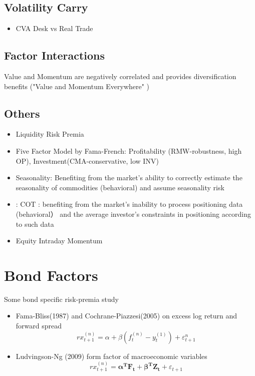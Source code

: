 \documentclass[11pt, openany]{book}              %
\begin{document}
\subsection{Volatility Carry}
\begin{itemize}
	\item  CVA Desk vs Real Trade
\end{itemize}

\subsection{Factor Interactions}
Value and Momentum are negatively correlated and provides diversification benefits ("Value and Momentum Everywhere" )

\subsection{Others}
\begin{itemize}
	\item Liquidity Risk Premia 
	\item Five Factor Model by Fama-French: Profitability (RMW-robustness, high OP), Investment(CMA-conservative, low INV)
	\item Seasonality: Benefiting from the market's ability to correctly estimate the seasonality of commodities (behavioral) and assume seasonality risk
	\item: COT : benefiting from the market's inability to process positioning data (behavioral） and the average investor's constraints in positioning according to such data
	\item Equity Intraday Momentum
\end{itemize}

\section{Bond Factors}

Some bond specific risk-premia study

\begin{itemize}
	\item Fama-Bliss(1987) and Cochrane-Piazzesi(2005) on excess log return and forward spread
		$$rx_{t+1}^{(n)} = \alpha + \beta (f_t^{(n)} - y_t^{(1)}) + \varepsilon_{t+1}^n$$
	\item Ludvingson-Ng (2009) form factor of macroeconomic variables
	$$rx_{t+1}^{(n)} = \boldsymbol{\alpha^TF_t} + \boldsymbol{\beta^T Z_t} +\varepsilon_{t+1}$$
\end{itemize}
\end{document}
